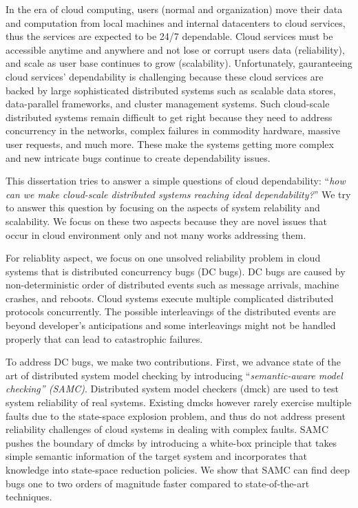 In the era of cloud computing, users (normal and organization) move their data
and computation from local machines and internal datacenters to cloud services,
thus the services are expected to be 24/7 dependable. Cloud services must be
accessible anytime and anywhere and not lose or corrupt users data
(reliability), and scale as user base continues to grow (scalability).
Unfortunately, gauranteeing cloud services' dependability is challenging because
these cloud services are backed by large sophisticated distributed systems such
as scalable data stores, data-parallel frameworks, and cluster management
systems. Such cloud-scale distributed systems remain difficult to get right
because they need to address concurrency in the networks, complex failures in
commodity hardware, massive user requests, and much more.  These make the
systems getting more complex and new intricate bugs continue to create
dependability issues.

This dissertation tries to answer a simple questions of cloud dependability:
``{\em how can we make cloud-scale distributed systems reaching ideal
dependability?}'' We try to answer this question by focusing on the aspects of
system relability and scalability. We focus on these two aspects because they
are novel issues that occur in cloud environment only and not many works
addressing them.

For reliablity aspect, we focus on one unsolved reliability problem in cloud
systems that is distributed concurrency bugs (DC bugs). DC bugs are caused by
non-deterministic order of distributed events such as message arrivals, machine
crashes, and reboots. Cloud systems execute multiple complicated distributed
protocols concurrently. The possible interleavings of the distributed events are
beyond developer's anticipations and some interleavings might not be handled
properly that can lead to catastrophic failures.

To address DC bugs, we make two contributions. First, we advance state of the
art of distributed system model checking by introducing ``{\em semantic-aware
model checking'' (SAMC)}. Distributed system model checkers (dmck) are used to
test system reliability of real systems. Existing dmcks however rarely exercise
multiple faults due to the state-space explosion problem, and thus do not
address present reliability challenges of cloud systems in dealing with complex
faults. SAMC pushes the boundary of dmcks by introducing a white-box principle
that takes simple semantic information of the target system and incorporates
that knowledge into state-space reduction policies.  We show that SAMC can find
deep bugs one to two orders of magnitude faster compared to state-of-the-art
techniques. 

